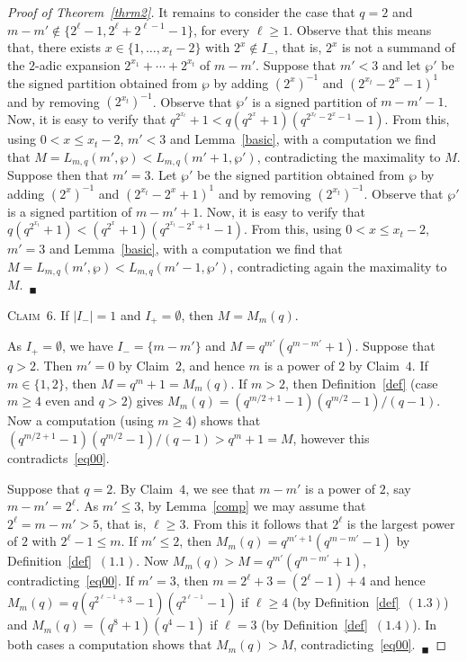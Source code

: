 \documentclass{amsart}
\begin{document}
\begin{proof}[Proof of Theorem~\ref{thrm2}]
It remains to consider the case that $q=2$ and $m-m'\notin\{ 2^\ell-1,2^\ell+2^{\ell-1}-1\}$, for every $\ell\geq 1$. Observe that this means that, there exists $x\in \{1,\ldots, x_t-2\}$ with $2^x\notin I_-$, that is, $2^x$ is not a summand of the $2$-adic expansion $2^{x_1}+\cdots +2^{x_t}$ of $m-m'$. Suppose that $m'<3$ and  let $\wp'$ be the signed partition obtained from $\wp$ by adding $(2^x)^{-1}$ and $(2^{x_t}-2^x-1)^1$ and by removing $(2^{x_t})^{-1}$. Observe that $\wp'$ is a signed partition of $m-m'-1$. Now, it is easy to verify that $q^{2^{x_t}}+1<q(q^{2^{x}}+1)(q^{2^{x_t}-2^x-1}-1)$. From this, using $0<x\leq x_t-2$, $m'<3$ and Lemma~\ref{basic}, with a computation we find that $M=L_{m,q}(m',\wp)<L_{m,q}(m'+1,\wp')$, contradicting the maximality to $M$. Suppose then that $m'=3$.  Let $\wp'$ be the signed partition obtained from $\wp$ by adding $(2^x)^{-1}$ and $(2^{x_t}-2^x+1)^1$ and by removing $(2^{x_t})^{-1}$. Observe that $\wp'$ is a signed partition of $m-m'+1$. Now, it is easy to verify that $q(q^{2^{x_t}}+1)<(q^{2^{x}}+1)(q^{2^{x_t}-2^x+1}-1)$. From this, using $0<x\leq x_t-2$, $m'=3$ and Lemma~\ref{basic}, with a computation we find that $M=L_{m,q}(m',\wp)<L_{m,q}(m'-1,\wp')$, contradicting again the maximality to $M$.~$_\blacksquare$

\smallskip

\noindent\textsc{Claim~$6$. }If $|I_-|=1$ and $I_+=\emptyset$, then $M=M_m(q)$.

\smallskip

\noindent As $I_+=\emptyset$, we have $I_{-}=\{m-m'\}$ and $M=q^{m'}(q^{m-m'}+1)$. Suppose that $q>2$. Then $m'=0$ by Claim~$2$, and hence $m$ is a power of $2$ by Claim~$4$. If $m\in \{1,2\}$, then $M=q^m+1=M_{m}(q)$. If $m>2$, then  Definition~\ref{def} (case $m\geq 4$ even and $q>2$) gives $M_{m}(q)=(q^{m/2+1}-1)(q^{m/2}-1)/(q-1)$. Now a computation (using $m\geq 4$) shows that $(q^{m/2+1}-1)(q^{m/2}-1)/(q-1)>q^m+1=M$, however this contradicts~\eqref{eq00}.

Suppose that $q=2$. By Claim~$4$, we see that $m-m'$ is a power of $2$, say $m-m'=2^\ell$. As $m'\leq 3$, by Lemma~\ref{comp} we may assume that $2^\ell=m-m'>5$, that is, $\ell\geq 3$. From this it follows that $2^\ell$ is the largest power of $2$ with $2^\ell-1\leq m$. If  $m'\leq 2$, then  $M_m(q)=q^{m'+1}(q^{m-m'}-1)$ by Definition~\ref{def}~$(1.1)$. Now $M_m(q)>M=q^{m'}(q^{m-m'}+1)$, contradicting~\eqref{eq00}. If $m'=3$, then $m=2^\ell+3=(2^\ell-1)+4$ and hence $M_m(q)=q(q^{2^{\ell-1}+3}-1)(q^{2^{\ell-1}}-1)$ if $\ell\geq 4$ (by Definition~\ref{def}~$(1.3)$) and $M_m(q)=(q^8+1)(q^4-1)$ if $\ell=3$ (by Definition~\ref{def}~$(1.4)$). In both cases a computation shows that $M_m(q)>M$, contradicting~\eqref{eq00}.~$_\blacksquare$


\end{proof}
\end{document}
